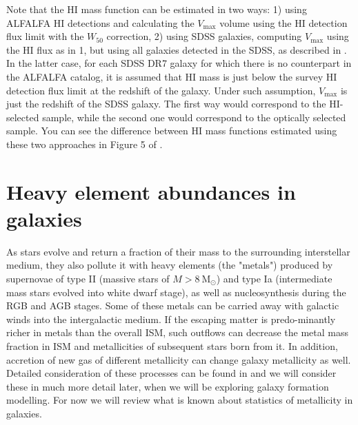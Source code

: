 Note that the HI mass function can be estimated in two ways: 1) using ALFALFA HI detections and calculating the $V_{\mathrm{max}}$ volume using the HI detection flux limit with the $W_{50}$ correction, 2) using SDSS galaxies, computing  $V_{\mathrm{max}}$ using the HI flux as in 1, but using all galaxies detected in the SDSS, as  described in \href{http://adsabs.harvard.edu/abs/2012ApJ...759..138P}{\citet{papastergis_etal12}}. In the latter case, for each SDSS DR7 galaxy for which there is no counterpart in the ALFALFA catalog, it is assumed that HI mass is just below the survey HI detection flux limit at the redshift of the galaxy. Under such assumption, $V_{\mathrm{max}}$ is just the redshift of the SDSS galaxy. The first way would correspond to the HI-selected sample, while the second one would correspond to the optically selected sample. You can see the difference between HI mass functions estimated using these two approaches in Figure 5 of  \href{http://adsabs.harvard.edu/abs/2012ApJ...759..138P}{\citet{papastergis_etal12}}. 


\section{Heavy element abundances in galaxies}
\label{sec:Zoverview}

As stars evolve and return a fraction of their mass to the surrounding interstellar medium, they also pollute it with heavy elements (the "metals") produced by supernovae of type II (massive stars of $M>8\ \mathrm{M_\odot}$) and type Ia (intermediate mass stars evolved into white dwarf stage), as well as nucleosynthesis during the RGB and AGB stages. Some of these metals can be carried away with galactic winds into the intergalactic medium. If the escaping matter is predo-minantly richer in metals than the overall ISM, such outflows can decrease the metal mass fraction in ISM and metallicities of subsequent stars born from it. In addition, accretion of new gas of different metallicity can change galaxy metallicity as well. Detailed consideration of these processes can be found in \href{http://adsabs.harvard.edu/abs/2007ApJ...658..941D}{\citet{dalcanton07}} and we will consider these in much more detail later, when we will be exploring galaxy formation modelling. For now we will review what is known about statistics of metallicity in galaxies. 

